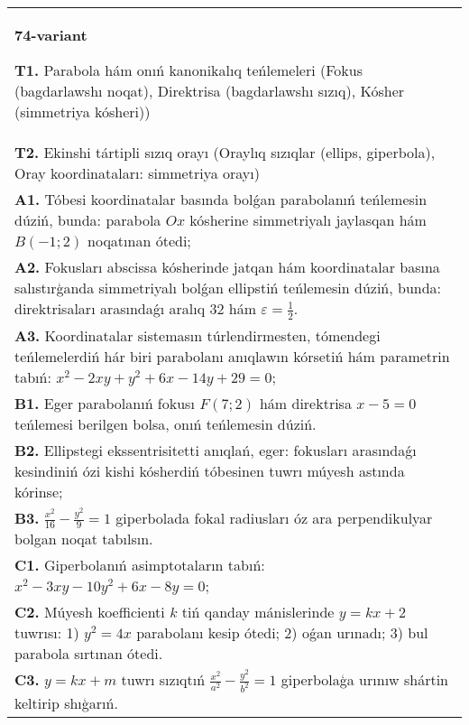 \documentclass{article}
\begin{document}
\begin{tabular}{m{17cm}}
\textbf{74-variant}
\newline

\textbf{T1.} Parabola hám onıń kanonikalıq teńlemeleri (Fokus (bagdarlawshı noqat), Direktrisa (bagdarlawshı sızıq), Kósher (simmetriya kósheri)) \\
\textbf{T2.} Ekinshi tártipli sızıq orayı (Oraylıq sızıqlar (ellips, giperbola), Oray koordinataları: simmetriya orayı) \\
\textbf{A1.} Tóbesi koordinatalar basında bolǵan parabolanıń teńlemesin dúziń, bunda: parabola $Ox$ kósherine simmetriyalı jaylasqan hám $B (-1; 2) $ noqatınan ótedi; \\
\textbf{A2.} Fokusları abscissa kósherinde jatqan hám koordinatalar basına salıstırģanda simmetriyalı bolǵan ellipstiń teńlemesin dúziń, bunda: direktrisaları arasındaǵı aralıq 32 hám $\varepsilon=\frac{1}{2}$. \\
\textbf{A3.} Koordinatalar sistemasın túrlendirmesten, tómendegi teńlemelerdiń hár biri parabolanı anıqlawın kórsetiń hám parametrin tabıń: $x^2-2 x y+y^2+6 x-14 y+29=0$; \\
\textbf{B1.} Eger parabolanıń fokusı $F (7; 2) $ hám direktrisa $x-5=0$ teńlemesi berilgen bolsa, onıń teńlemesin dúziń. \\
\textbf{B2.} Ellipstegi ekssentrisitetti anıqlań, eger: fokusları arasındaǵı kesindiniń ózi kishi kósherdiń tóbesinen tuwrı múyesh astında kórinse; \\
\textbf{B3.} $\frac{x^2}{16}-\frac{y^2}{9}=1$ giperbolada fokal radiusları óz ara perpendikulyar bolgan noqat tabılsın. \\
\textbf{C1.} Giperbolanıń asimptotaların tabıń: $x^2-3 x y-10 y^2+6 x-8 y=0$; \\
\textbf{C2.} Múyesh koefficienti $k$ tiń qanday mánislerinde $y=kx+2$ tuwrısı: 1) $y^2=4x$ parabolanı kesip ótedi; 2) oǵan urınadı; 3) bul parabola sırtınan ótedi. \\
\textbf{C3.} $y=k x+m$ tuwrı sızıqtıń $\frac{x^2}{a^2}-\frac{y^2}{b^2}=1$ giperbolaģa urınıw shártin keltirip shıģarıń. \\

\end{tabular}
\vspace{1cm}
\end{document}
